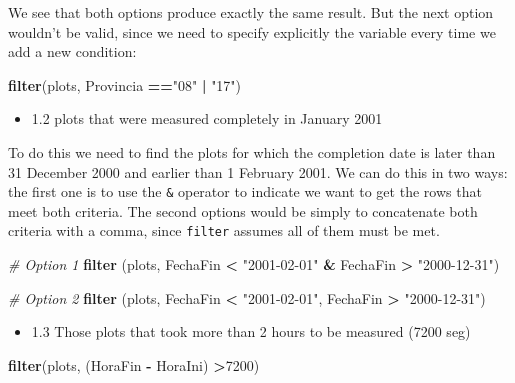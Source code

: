 \documentclass[]{article}
\newenvironment{Shaded}{\begin{snugshade}}{\end{snugshade}}
\newcommand{\KeywordTok}[1]{\textcolor[rgb]{0.13,0.29,0.53}{\textbf{#1}}}
\newcommand{\DecValTok}[1]{\textcolor[rgb]{0.00,0.00,0.81}{#1}}
\newcommand{\StringTok}[1]{\textcolor[rgb]{0.31,0.60,0.02}{#1}}
\newcommand{\CommentTok}[1]{\textcolor[rgb]{0.56,0.35,0.01}{\textit{#1}}}
\newcommand{\OperatorTok}[1]{\textcolor[rgb]{0.81,0.36,0.00}{\textbf{#1}}}
\newcommand{\NormalTok}[1]{#1}
\providecommand{\tightlist}{%
  \setlength{\itemsep}{0pt}\setlength{\parskip}{0pt}}
\begin{document}
We see that both options produce exactly the same result. But the next
option wouldn't be valid, since we need to specify explicitly the
variable every time we add a new condition:

\begin{Shaded}
\begin{Highlighting}[]
\KeywordTok{filter}\NormalTok{(plots, Provincia }\OperatorTok{==}\StringTok{"08"} \OperatorTok{|}\StringTok{ "17"}\NormalTok{)}
\end{Highlighting}
\end{Shaded}

\begin{itemize}
\tightlist
\item
  1.2 plots that were measured completely in January 2001
\end{itemize}

To do this we need to find the plots for which the completion date is
later than 31 December 2000 and earlier than 1 February 2001. We can do
this in two ways: the first one is to use the \texttt{\&} operator to
indicate we want to get the rows that meet both criteria. The second
options would be simply to concatenate both criteria with a comma, since
\texttt{filter} assumes all of them must be met.

\begin{Shaded}
\begin{Highlighting}[]
    \CommentTok{# Option 1}
    \KeywordTok{filter}\NormalTok{ (plots, FechaFin }\OperatorTok{<}\StringTok{ "2001-02-01"} \OperatorTok{&}\StringTok{ }\NormalTok{FechaFin }\OperatorTok{>}\StringTok{ "2000-12-31"}\NormalTok{)}

    \CommentTok{# Option 2}
    \KeywordTok{filter}\NormalTok{ (plots, FechaFin }\OperatorTok{<}\StringTok{ "2001-02-01"}\NormalTok{, FechaFin }\OperatorTok{>}\StringTok{ "2000-12-31"}\NormalTok{)}
\end{Highlighting}
\end{Shaded}

\begin{itemize}
\tightlist
\item
  1.3 Those plots that took more than 2 hours to be measured (7200 seg)
\end{itemize}

\begin{Shaded}
\begin{Highlighting}[]
    \KeywordTok{filter}\NormalTok{(plots, (HoraFin }\OperatorTok{-}\StringTok{ }\NormalTok{HoraIni) }\OperatorTok{>}\DecValTok{7200}\NormalTok{)}
\end{Highlighting}
\end{Shaded}
\end{document}
